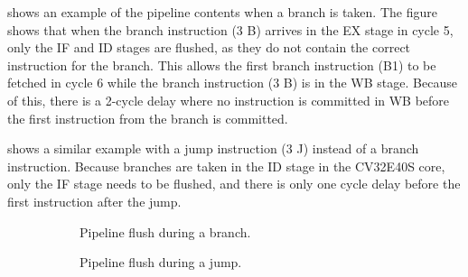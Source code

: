  shows an example of the pipeline contents when a branch is taken. The figure shows that when the branch instruction (3 B) arrives in the EX stage in cycle 5, only the IF and ID stages are flushed, as they do not contain the correct instruction for the branch. This allows the first branch instruction (B1) to be fetched in cycle 6 while the branch instruction (3 B) is in the WB stage. Because of this, there is a 2-cycle delay where no instruction is committed in WB before the first instruction from the branch is committed.

 shows a similar example with a jump instruction (3 J) instead of a branch instruction. Because branches are taken in the ID stage in the CV32E40S core, only the IF stage needs to be flushed, and there is only one cycle delay before the first instruction after the jump.


\begin{figure}
     \centering
     \begin{subfigure}[b]{0.48\textwidth}
        \centering
        \resizebox{1\textwidth}{!}{%
            
        }
        \caption{Pipeline flush during a branch.}
        \label{fig:branch_flush}
     \end{subfigure}
     \hfill
     \begin{subfigure}[b]{0.48\textwidth}
        \centering
        \resizebox{1\textwidth}{!}{%
            
        }
        \caption{Pipeline flush during a jump.}
        \label{fig:jump_flush}
     \end{subfigure}
     
    \caption{}
    \label{fig:flush graphs}
\end{figure}






%            
%        
%            
%            
%    



